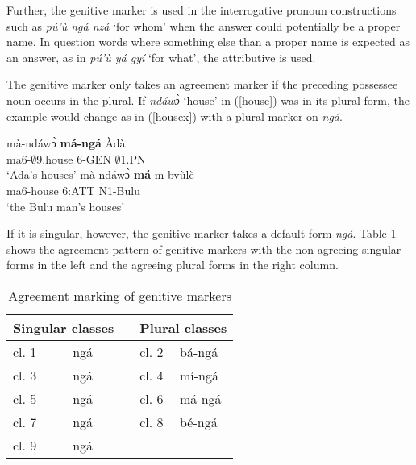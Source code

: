 \noindent Further, the genitive marker is used in the interrogative pronoun constructions such as {\itshape pú'ù ngá nzá} `for whom' when the answer could potentially be a proper name.  In question words where something else than a proper name is expected as an answer, as in {\itshape pú'ù yá gyí} `for what', the attributive is used.

The genitive marker only takes an agreement marker if the preceding possessee noun occurs in the plural. If {\itshape ndáwɔ̀} `house' in (\ref{house}) was in its plural form, the example would change as in (\ref{housex}) with a plural marker on {\itshape ngá}.

\begin{exe}
\ex\label{housex}
\begin{xlist}
\ex\label{housex1}
 \gll    mà-ndáwɔ̀ {\bfseries má-ngá} Àdà \\
                ma6-$\emptyset$9.house 6-GEN $\emptyset$1.PN\\
    \trans `Ada's houses'
\ex \label{housex2}
  \gll     mà-ndáwɔ̀ {\bfseries má} m-bvùlè \\
                ma6-house 6:ATT N1-Bulu \\
    \trans `the Bulu man's houses'
\end {xlist}
\end {exe}


\noindent If it is singular, however, the genitive marker takes a default form {\itshape ngá}. Table \ref{Tab:nga} shows the agreement pattern of genitive markers with the non-agreeing singular forms in the left and the agreeing plural forms in the right column. 

\begin{table} 
\centering
\begin{tabular}{llp{1cm}lp{2cm}}
 \midrule
\multicolumn{2}{l}{Singular classes} & & \multicolumn{2}{l}{Plural classes} \\
 \midrule
cl. 1 & ngá & & cl. 2 & bá-ngá \\
cl. 3 & ngá & & cl. 4 & mí-ngá \\
cl. 5 & ngá & & cl. 6 & má-ngá \\
cl. 7 & ngá & & cl. 8 & bé-ngá \\
cl. 9 & ngá &    &     &              \\
 \midrule
\end{tabular}
\caption{Agreement marking of genitive markers}
\label{Tab:nga}
\end{table}

